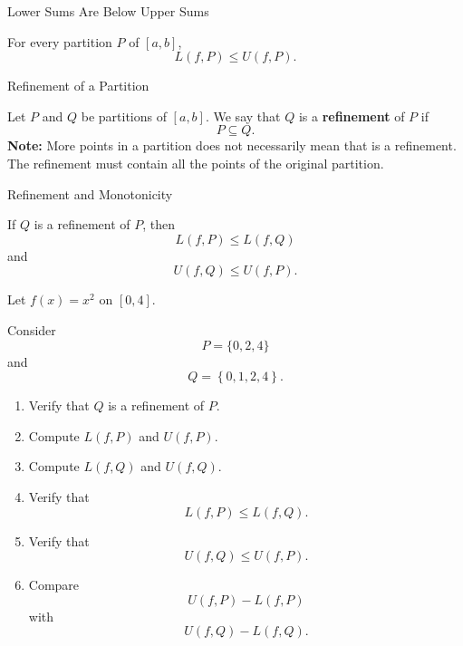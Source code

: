\documentclass[12pt,a4paper]{article}
\begin{document}
\clearpage

\begin{heading}
Lower Sums Are Below Upper Sums
\end{heading}

\begin{theorem}
For every partition $P$ of $[a,b]$,
\[
L(f,P)\le U(f,P).
\]
\end{theorem}


\clearpage

\begin{heading}
Refinement of a Partition
\end{heading}

\begin{definition}[Refinement]
Let $P$ and $Q$ be partitions of $[a,b]$. We say that $Q$ is a \textbf{refinement} of $P$ if
\[
P\subseteq Q.
\]
\textbf{Note:} More points in a partition does not necessarily mean that is a refinement. The refinement must contain all the points of the original partition.
\end{definition}


\clearpage

\begin{heading}
Refinement and Monotonicity
\end{heading}

\begin{theorem}
If $Q$ is a refinement of $P$, then
\[
L(f,P)\le L(f,Q)
\]
and
\[
U(f,Q)\le U(f,P).
\]
\end{theorem}

\clearpage

\begin{problem}
Let
\(
f(x)=x^2
\)
on $[0,4]$.

Consider
\[
P=\{0,2,4\}
\]
and
\[
Q=
\left\{
0,1,2,4
\right\}.
\]

\begin{enumerate}
    \item Verify that $Q$ is a refinement of $P$.

    \item Compute $L(f,P)$ and $U(f,P)$.

    \item Compute $L(f,Q)$ and $U(f,Q)$.

    \item Verify that
    \[
    L(f,P)\le L(f,Q).
    \]

    \item Verify that
    \[
    U(f,Q)\le U(f,P).
    \]

    \item Compare
    \[
    U(f,P)-L(f,P)
    \]
    with
    \[
    U(f,Q)-L(f,Q).
    \]
\end{enumerate}
\end{problem}
\end{document}
